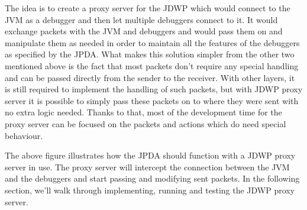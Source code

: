 \documentclass[..thesis.tex]{subfiles}
\begin{document}
The idea is to create a proxy server for the JDWP which would connect to the JVM as a debugger and then let multiple debuggers connect to it.
It would exchange packets with the JVM and debuggers and would pass them on and manipulate them as needed in order to maintain all the features of the debuggers as specified by the JPDA.
What makes this solution simpler from the other two mentioned above is the fact that most packets don't require any special handling and can be passed directly from the sender to the receiver.
With other layers, it is still required to implement the handling of such packets, but with JDWP proxy server it is possible to simply pass these packets on to where they were sent with no extra logic needed.
Thanks to that, most of the development time for the proxy server can be focused on the packets and actions which do need special behaviour.



The above figure illustrates how the JPDA should function with a JDWP proxy server in use.
The proxy server will intercept the connection between the JVM and the debuggers and start passing and modifying sent packets.
In the following section, we'll walk through implementing, running and testing the JDWP proxy server.
\end{document}
